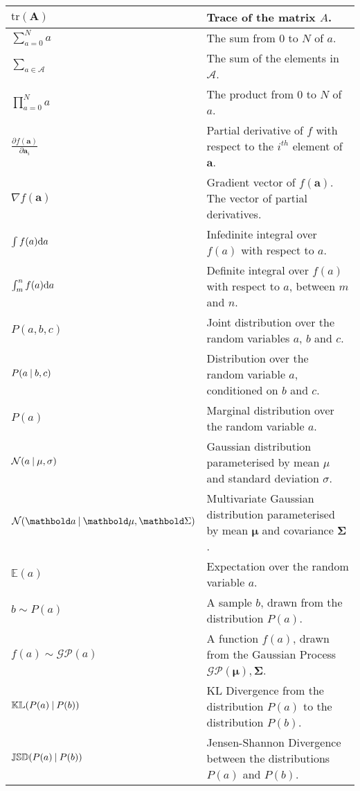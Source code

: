 \begin{longtable}{p{} | p{}}
  \( \text{tr}(\bm{A}) \) & Trace of the matrix \( A \).\\
  \hline
  \(\sum_{a = 0}^{N} a\) & The sum from \( 0 \) to \( N \) of \( a \).\\
  \(\sum_{a \in \mathcal{A}}\) & The sum of the elements in \( \mathcal{A} \).\\
  \(\prod_{a = 0}^{N} a\) & The product from \( 0 \) to \( N \) of \( a \).\\
  \hline
  \( \frac{\partial f(\bm{a})}{\partial \bm{a}_{i}} \) & Partial derivative of \( f \) with respect to the \( i^{th} \) element of \( \bm{a} \).\\
  \( \nabla f(\bm{a}) \) & Gradient vector of \( f(\bm{a}) \). The vector of partial derivatives.\\
  \( \int f(a) {\mathrm d{a}} \) & Infedinite integral over \( f(a) \) with respect to \( a \).\\
  \( \int_{m}^{n} f(a) {\mathrm d{a}} \) & Definite integral over \( f(a) \) with respect to \( a \), between \( m \) and \( n \).\\
  \hline
  \( P(a, b, c) \) & Joint distribution over the random variables \( a \), \( b \) and \( c \).\\
  \( P(a \:\vert\: b, c) \) & Distribution over the random variable \( a \), conditioned on \( b \) and \( c \).\\
  \( P(a) \) & Marginal distribution over the random variable \( a \).\\
  \( \mathcal{N}(a \:\vert\: \mu, \sigma) \) & Gaussian distribution parameterised by mean \( \mu \) and standard deviation \( \sigma \).\\
  \( \mathcal{N}(\bm{a} \given \bm{\mu}, \bm{\Sigma}) \) & Multivariate Gaussian distribution parameterised by mean \( \bm{\mu} \) and covariance \( \bm{\Sigma} \).\\
  \( \mathbb{E}(a) \) & Expectation over the random variable \( a \).\\
  \( b \sim P(a) \) & A sample \( b \), drawn from the distribution \( P(a) \).\\
  \( f(a) \sim \mathcal{GP}(a) \) & A function \( f(a) \), drawn from the Gaussian Process \( \mathcal{GP}(\bm{\mu}), \bm{\Sigma} \).\\
  \( \mathbb{KL}(P(a) \:\vert\: P(b)) \) & KL Divergence from the distribution \( P(a) \) to the distribution \( P(b) \).\\
  \( \mathbb{JSD}(P(a) \:\vert\: P(b)) \) & Jensen-Shannon Divergence between the distributions \( P(a) \) and \( P(b) \).
~\label{table:mathematical_notation}
\end{longtable}

